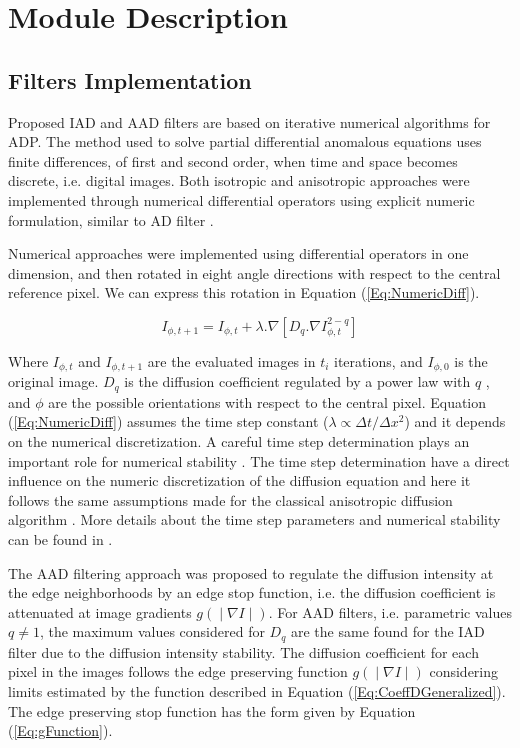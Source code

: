 \documentclass{InsightArticle}
\begin{document}
\section{Module Description}

\subsection{Filters Implementation}

Proposed IAD and AAD filters are based on iterative numerical algorithms for ADP. The method used to solve partial differential anomalous equations uses finite differences, of first and second order, when time and space becomes discrete, i.e. digital images. Both isotropic and anisotropic approaches were implemented through numerical differential operators using explicit numeric formulation, similar to AD filter \cite{PERONA1990}. 

Numerical approaches were implemented using differential operators in one dimension, and then rotated in eight angle directions with respect to the central reference pixel. We can express this rotation in Equation (\ref{Eq:NumericDiff}).

\begin{equation}\label{Eq:NumericDiff}
I_{\phi,t+1}=I_{\phi,t}+\lambda . \nabla [D_{q}.\nabla I_{\phi,t}^{2-q}]
\end{equation}

Where $I_{\phi,t}$ and $I_{\phi,t+1}$ are the evaluated images in $t_i$ iterations, and $I_{\phi,0}$ is the original image. $D_q$ is the diffusion coefficient regulated by a power law with $q$ \cite{Schwammle2008}, and $\phi$ are the possible orientations with respect to the central pixel. Equation (\ref{Eq:NumericDiff}) assumes the time step constant \cite{PERONA1990} ($\lambda \propto \Delta t/\Delta x^{2}$) and it depends on the numerical discretization. A careful time step determination plays an important role for numerical stability \cite{PERONA1990}. The time step determination have a direct influence on the numeric discretization of the diffusion equation and here it follows the same assumptions made for the classical anisotropic diffusion algorithm \cite{PERONA1990}. More details about the time step parameters and numerical stability can be found in \cite{SenraFilho2015,PERONA1990}.

The AAD filtering approach was proposed to regulate the diffusion intensity at the edge neighborhoods by an edge stop function, i.e. the diffusion coefficient is attenuated at image gradients $g(∣\nabla I∣)$. For AAD filters, i.e. parametric values $q \neq 1$, the maximum values considered for $D_q$ are the same found for the IAD filter due to the diffusion intensity stability. The diffusion coefficient for each pixel in the images follows the edge preserving function $g(∣\nabla I∣)$ considering limits estimated by the function described in Equation (\ref{Eq:CoeffDGeneralized}). The edge preserving stop function has the form given by Equation (\ref{Eq:gFunction}).
\end{document}
